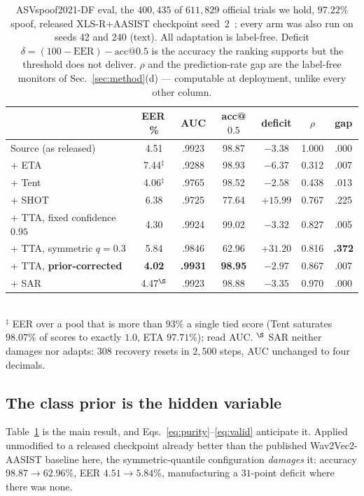 \documentclass[conference]{IEEEtran}
\begin{document}
\begin{table}[t]
\centering
\caption{ASVspoof2021-DF eval, the $400{,}435$ of $611{,}829$ official trials we
hold, $97.22\%$ spoof,
released XLS-R+AASIST checkpoint seed~2~\cite{deepfensehf}; every arm was also
run on seeds 42 and 240 (text). All adaptation is label-free. Deficit $\delta=(100{-}\mathrm{EER})-\mathrm{acc}@0.5$
is the accuracy the ranking supports but the threshold does not deliver. $\rho$
and the prediction-rate gap are the label-free monitors of
Sec.~\ref{sec:method}(d) --- computable at deployment, unlike every other
column.}
\label{tab:protoa}
\small
\begin{tabular}{@{}lcccccc@{}}
\toprule
& EER\,\% & AUC & acc@$0.5$ & deficit & $\rho$ & gap \\
\midrule
Source (as released) & 4.51 & .9923 & 98.87 & $-3.38$ & 1.000 & .000 \\
\;+ ETA~\cite{eata} & 7.44$^\ddagger$ & .9288 & 98.93 & $-6.37$ & 0.312 & .007 \\
\;+ Tent~\cite{tent} & 4.06$^\ddagger$ & .9765 & 98.52 & $-2.58$ & 0.438 & .013 \\
\;+ SHOT~\cite{shot} & 6.38 & .9725 & 77.64 & $+15.99$ & 0.767 & .225 \\
\;+ TTA, fixed confidence $0.95$ & 4.30 & .9924 & 99.02 & $-3.32$ & 0.827 & .005 \\
\;+ TTA, symmetric $q{=}0.3$ & 5.84 & .9846 & 62.96 & $+31.20$ & 0.816 & \textbf{.372} \\
\rowcolor{green!12}\;+ TTA, \textbf{prior-corrected} & \textbf{4.02} & \textbf{.9931} & \textbf{98.95} & $-2.97$ & 0.867 & .007 \\
\;+ SAR~\cite{sar} & 4.47$^\S$ & .9923 & 98.88 & $-3.35$ & 0.970 & .000 \\
\bottomrule
\end{tabular}
\\[2pt]
\small $^\ddagger$ EER over a pool that is more
than $93\%$ a single tied score (Tent saturates $98.07\%$ of scores to exactly
$1.0$, ETA $97.71\%$); read AUC. $^\S$ SAR neither damages nor adapts: $308$
recovery resets in $2{,}500$ steps, AUC unchanged to four decimals.
\end{table}

\subsection{The class prior is the hidden variable}
Table~\ref{tab:protoa} is the main result, and
Eqs.~\eqref{eq:purity}--\eqref{eq:valid} anticipate it. Applied unmodified to a
released checkpoint already better than the published Wav2Vec2-AASIST baseline
here, the symmetric-quantile configuration \emph{damages} it: accuracy
$98.87\!\to\!62.96\%$, EER $4.51\!\to\!5.84\%$, manufacturing a $31$-point deficit
where there was none.
\end{document}
